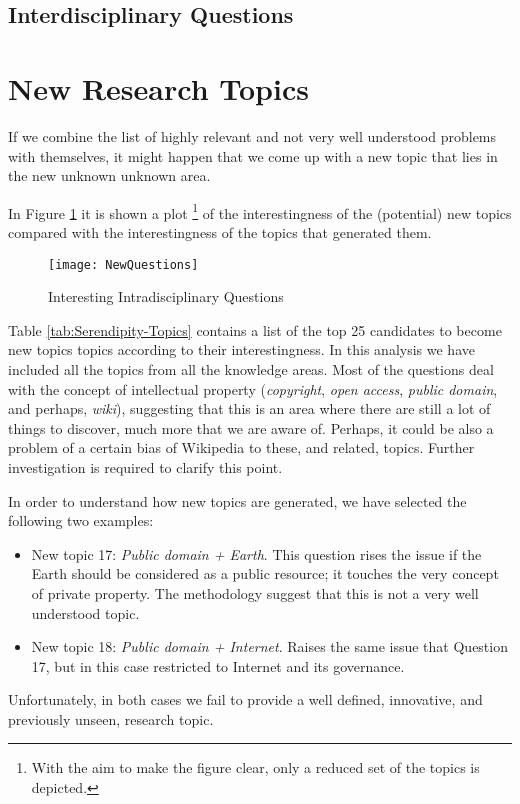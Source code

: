 \subsection{Interdisciplinary Questions}

\section{New Research Topics}

If we combine the list of highly relevant and not very well understood
problems with themselves, it might happen that we come up with a new
topic that lies in the new unknown unknown area.

In Figure \ref{fig:Interesting-Intradisciplinary-Qu} it is shown
a plot%
\footnote{With the aim to make the figure clear, only a reduced set of the topics
is depicted.%
} of the interestingness of the (potential) new topics compared with
the interestingness of the topics that generated them.

\begin{figure}[h]
\centering\texttt{[image: NewQuestions]}
\caption{\label{fig:Interesting-Intradisciplinary-Qu}Interesting Intradisciplinary
Questions}
\end{figure}

Table \ref{tab:Serendipity-Topics} contains a list of the top 25
candidates to become new topics topics according to their interestingness.
In this analysis we have included all the topics from all the knowledge
areas. Most of the questions deal with the concept of intellectual
property (\emph{copyright}, \emph{open access}, \emph{public domain},
and perhaps, \emph{wiki}), suggesting that this is an area where there
are still a lot of things to discover, much more that we are aware
of. Perhaps, it could be also a problem of a certain bias of Wikipedia
to these, and related, topics. Further investigation is required to
clarify this point.

In order to understand how new topics are generated, we have selected
the following two examples:
\begin{itemize}
\item New topic 17: \emph{Public domain + Earth}. This question rises the
issue if the Earth should be considered as a public resource; it touches
the very concept of private property. The methodology suggest that
this is not a very well understood topic.
\item New topic 18: \emph{Public domain + Internet}. Raises the same issue
that Question 17, but in this case restricted to Internet and its
governance.
\end{itemize}
Unfortunately, in both cases we fail to provide a well defined, innovative,
and previously unseen, research topic.

